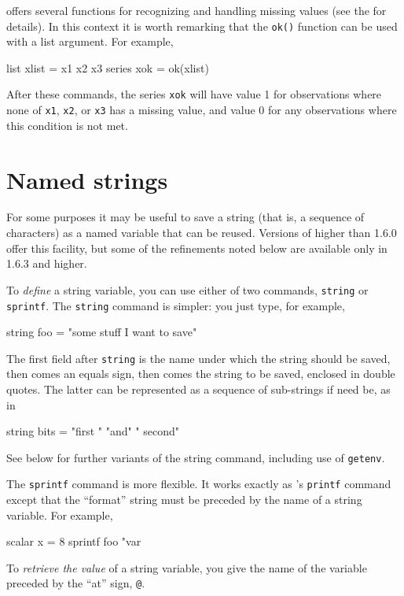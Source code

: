  offers several functions for recognizing and handling
missing values (see the \GCR{} for details). In this context it is
worth remarking that the \texttt{ok()} function can be used with a
list argument.  For example,
%
\begin{code}
list xlist = x1 x2 x3
series xok = ok(xlist)
\end{code}
%
After these commands, the series \texttt{xok} will have value 1 for
observations where none of \texttt{x1}, \texttt{x2}, or
\texttt{x3} has a missing value, and value 0 for any observations
where this condition is not met.


\section{Named strings}
\label{named-strings}

For some purposes it may be useful to save a string (that is, a
sequence of characters) as a named variable that can be reused.
Versions of  higher than 1.6.0 offer this facility, but
some of the refinements noted below are available only in 
1.6.3 and higher.

To \textit{define} a string variable, you can use either of two
commands, \texttt{string} or \texttt{sprintf}.  The \texttt{string}
command is simpler: you just type, for example,
%
\begin{code}
string foo = "some stuff I want to save"
\end{code}
%
The first field after \texttt{string} is the name under which the
string should be saved, then comes an equals sign, then comes the
string to be saved, enclosed in double quotes.  The latter can be
represented as a sequence of sub-strings if need be, as in
%
\begin{code}
string bits = "first " "and" " second"
\end{code}
%
See below for further variants of the string command, including use of
\texttt{getenv}.  

The \texttt{sprintf} command is more flexible.  It works exactly as
's \texttt{printf} command except that the ``format''
string must be preceded by the name of a string variable.  For
example,
%
\begin{code}
scalar x = 8
sprintf foo "var%
\end{code}

To \textit{retrieve the value} of a string variable, you give the name
of the variable preceded by the ``at'' sign, \verb|@|.  

